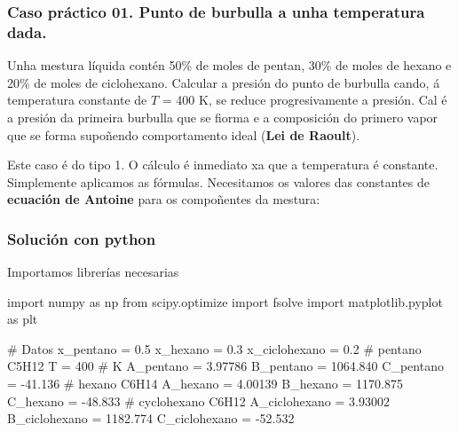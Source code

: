 \documentclass[
  letterpaper,
  DIV=11,
  numbers=noendperiod]{scrartcl}
\newenvironment{Shaded}{\begin{snugshade}}{\end{snugshade}}
\newcommand{\CommentTok}[1]{\textcolor[rgb]{0.37,0.37,0.37}{#1}}
\newcommand{\DecValTok}[1]{\textcolor[rgb]{0.68,0.00,0.00}{#1}}
\newcommand{\FloatTok}[1]{\textcolor[rgb]{0.68,0.00,0.00}{#1}}
\newcommand{\ImportTok}[1]{\textcolor[rgb]{0.00,0.46,0.62}{#1}}
\newcommand{\NormalTok}[1]{\textcolor[rgb]{0.00,0.23,0.31}{#1}}
\newcommand{\OperatorTok}[1]{\textcolor[rgb]{0.37,0.37,0.37}{#1}}
\begin{document}
\subsubsection{Caso práctico 01. Punto de burbulla a unha temperatura
dada.}\label{caso-pruxe1ctico-01.-punto-de-burbulla-a-unha-temperatura-dada.}

Unha mestura líquida contén 50\% de moles de pentan, 30\% de moles de
hexano e 20\% de moles de ciclohexano. Calcular a presión do punto de
burbulla cando, á temperatura constante de \(T\) = 400 K, se reduce
progresivamente a presión. Cal é a presión da primeira burbulla que se
fiorma e a composición do primero vapor que se forma supoñendo
comportamento ideal (\textbf{Lei de Raoult}).

Este caso é do tipo 1. O cálculo é inmediato xa que a temperatura é
constante. Simplemente aplicamos as fórmulas. Necesitamos os valores das
constantes de \textbf{ecuación de Antoine} para os compoñentes da
mestura:

\subsubsection{Solución con python}\label{soluciuxf3n-con-python}

Importamos librerías necesarias

\begin{Shaded}
\begin{Highlighting}[]
\ImportTok{import}\NormalTok{ numpy }\ImportTok{as}\NormalTok{ np}
\ImportTok{from}\NormalTok{ scipy.optimize }\ImportTok{import}\NormalTok{ fsolve}
\ImportTok{import}\NormalTok{ matplotlib.pyplot }\ImportTok{as}\NormalTok{ plt }
\end{Highlighting}
\end{Shaded}

\begin{Shaded}
\begin{Highlighting}[]
\CommentTok{\# Datos}
\NormalTok{x\_pentano     }\OperatorTok{=} \FloatTok{0.5}
\NormalTok{x\_hexano      }\OperatorTok{=} \FloatTok{0.3}
\NormalTok{x\_ciclohexano }\OperatorTok{=} \FloatTok{0.2}
\CommentTok{\# pentano C5H12}
\NormalTok{T }\OperatorTok{=} \DecValTok{400} \CommentTok{\# K}
\NormalTok{A\_pentano }\OperatorTok{=} \FloatTok{3.97786}
\NormalTok{B\_pentano }\OperatorTok{=} \FloatTok{1064.840}
\NormalTok{C\_pentano }\OperatorTok{=} \OperatorTok{{-}}\FloatTok{41.136}
\CommentTok{\# hexano C6H14}
\NormalTok{A\_hexano }\OperatorTok{=} \FloatTok{4.00139}
\NormalTok{B\_hexano }\OperatorTok{=} \FloatTok{1170.875}
\NormalTok{C\_hexano }\OperatorTok{=} \OperatorTok{{-}}\FloatTok{48.833}
\CommentTok{\# cyclohexano C6H12}
\NormalTok{A\_ciclohexano }\OperatorTok{=} \FloatTok{3.93002}
\NormalTok{B\_ciclohexano }\OperatorTok{=} \FloatTok{1182.774}
\NormalTok{C\_ciclohexano }\OperatorTok{=} \OperatorTok{{-}}\FloatTok{52.532}
\end{Highlighting}
\end{Shaded}
\end{document}
